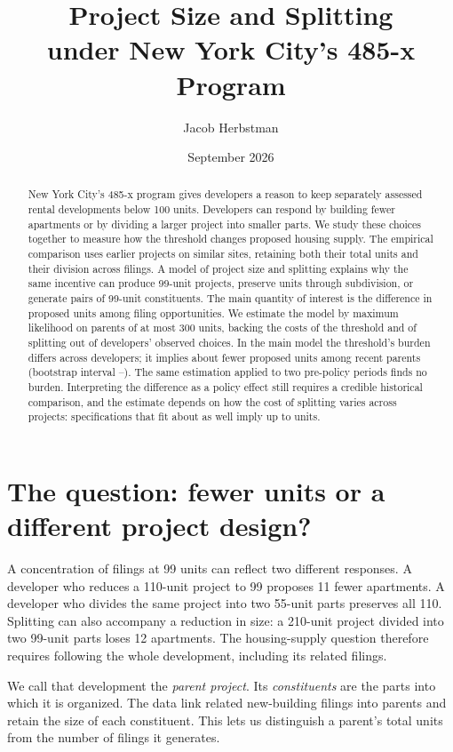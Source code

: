 \documentclass[11pt]{article}
\title{\vspace{-1.25cm}\textbf{Project Size and Splitting\\under New York City's 485-x Program}}
\author{Jacob Herbstman}
\date{September 2026}
\begin{document}
\maketitle
\vspace{-1em}
\begin{abstract}
New York City's 485-x program gives developers a reason to keep separately assessed rental developments below 100 units. Developers can respond by building fewer apartments or by dividing a larger project into smaller parts. We study these choices together to measure how the threshold changes proposed housing supply. The empirical comparison uses earlier projects on similar sites, retaining both their total units and their division across filings. A model of project size and splitting explains why the same incentive can produce 99-unit projects, preserve units through subdivision, or generate pairs of 99-unit constituents. The main quantity of interest is the difference in proposed units among filing opportunities. We estimate the model by maximum likelihood on parents of at most 300 units, backing the costs of the threshold and of splitting out of developers' observed choices. In the main model the threshold's burden differs across developers; it implies about \MainUnitsLost{} fewer proposed units among recent parents (bootstrap interval \MainUnitsLostLower--\MainUnitsLostUpper). The same estimation applied to two pre-policy periods finds no burden. Interpreting the difference as a policy effect still requires a credible historical comparison, and the estimate depends on how the cost of splitting varies across projects: specifications that fit about as well imply up to \LotSplittingUnitsLost{} units.
\end{abstract}

\section{The question: fewer units or a different project design?}

A concentration of filings at 99 units can reflect two different responses. A developer who reduces a 110-unit project to 99 proposes 11 fewer apartments. A developer who divides the same project into two 55-unit parts preserves all 110. Splitting can also accompany a reduction in size: a 210-unit project divided into two 99-unit parts loses 12 apartments. The housing-supply question therefore requires following the whole development, including its related filings.

We call that development the \emph{parent project}. Its \emph{constituents} are the parts into which it is organized. The data link related new-building filings into parents and retain the size of each constituent. This lets us distinguish a parent's total units from the number of filings it generates.
\end{document}
